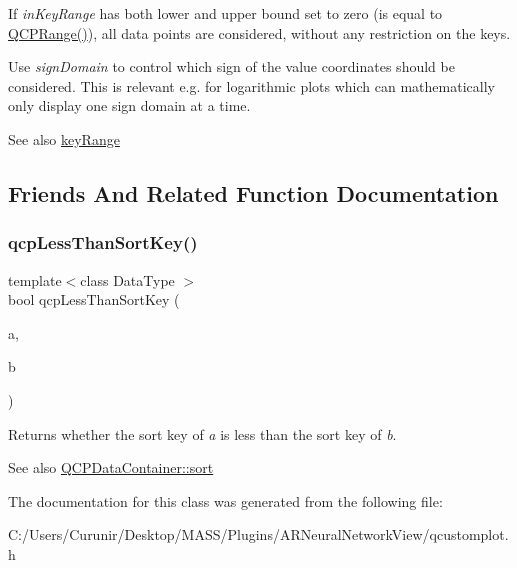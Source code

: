 If {\itshape in\+Key\+Range} has both lower and upper bound set to zero (is equal to {\ttfamily \hyperlink{class_q_c_p_range}{Q\+C\+P\+Range()}}), all data points are considered, without any restriction on the keys.

Use {\itshape sign\+Domain} to control which sign of the value coordinates should be considered. This is relevant e.\+g. for logarithmic plots which can mathematically only display one sign domain at a time.

\begin{DoxySeeAlso}{See also}
\hyperlink{class_q_c_p_data_container_aba6e1a93c21ccc56a432b4a02c9d0ed2}{key\+Range} 
\end{DoxySeeAlso}


\subsection{Friends And Related Function Documentation}
\mbox{\label{class_q_c_p_data_container_a74c5e06728cb6fa778a25d9ec0c4bd36}} 
\subsubsection{\texorpdfstring{qcp\+Less\+Than\+Sort\+Key()}{qcpLessThanSortKey()}}
{\footnotesize\ttfamily template$<$class Data\+Type $>$ \\
bool qcp\+Less\+Than\+Sort\+Key (\begin{DoxyParamCaption}\item[{const Data\+Type \&}]{a,  }\item[{const Data\+Type \&}]{b }\end{DoxyParamCaption})\hspace{0.3cm}{\ttfamily [related]}}

Returns whether the sort key of {\itshape a} is less than the sort key of {\itshape b}.

\begin{DoxySeeAlso}{See also}
\hyperlink{class_q_c_p_data_container_a75da92e33063b63d6da5014683591d45}{Q\+C\+P\+Data\+Container\+::sort} 
\end{DoxySeeAlso}


The documentation for this class was generated from the following file\+:\begin{DoxyCompactItemize}
\item 
C\+:/\+Users/\+Curunir/\+Desktop/\+M\+A\+S\+S/\+Plugins/\+A\+R\+Neural\+Network\+View/qcustomplot.\+h\end{DoxyCompactItemize}
